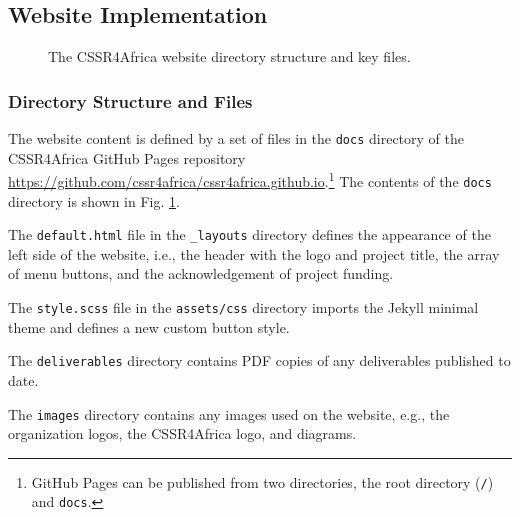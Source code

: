 \documentclass{CSSRforAfrica}
\begin{document}
\subsection{Website Implementation}

\begin{figure}[thb]
\vspace{-1mm}
\centering
{\footnotesize
\begin{minipage}{5cm}
\end{minipage}
}
\caption{The CSSR4Africa website directory structure and key files.}          
\label{fig:docs}                                                                
\end{figure}
 
\subsubsection{Directory Structure and Files}
The website content is defined by a set of files in the {\small \texttt{docs}} directory of the CSSR4Africa GitHub Pages repository {\small \url {https://github.com/cssr4africa/cssr4africa.github.io}}.\footnote{GitHub Pages can be published from two directories, the root directory ({\small \texttt {/}}) and {\footnotesize\texttt{docs}}.}  The contents of the {\small \texttt{docs}} directory is shown in  Fig. \ref{fig:docs}.

The  {\small \texttt{default.html}} file in the {\small \texttt{\_layouts}} directory defines the appearance of the left side of the website, i.e., the header with the logo and project title, the array of menu buttons, and the acknowledgement of project funding.

The  {\small \texttt{style.scss}} file in the {\small \texttt{assets/css}} directory imports the Jekyll minimal theme and defines a new custom button style.

The   {\small \texttt{deliverables}} directory contains PDF copies of any deliverables published to date.

The   {\small \texttt{images}} directory contains any images used on the website, e.g., the organization logos, the CSSR4Africa logo, and diagrams.
\end{document}
